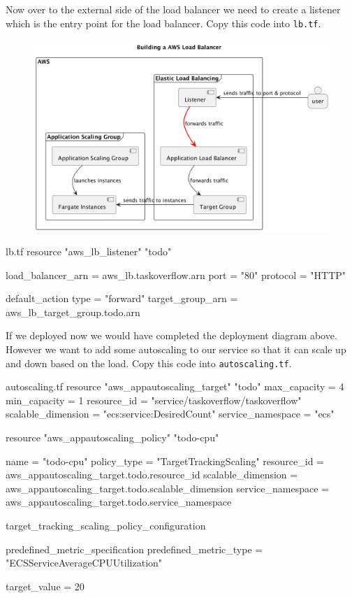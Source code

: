 \documentclass{csse4400}
\begin{document}
Now over to the external side of the load balancer we need to create a listener which is the entry point for the load balancer. Copy this code into \texttt{lb.tf}.

\begin{figure}[H]
  \begin{center}
    \includegraphics[scale=0.2]{diagrams/lb4fargate}
  \end{center}
\end{figure}

\begin{code}[language=terraform,numbers=none,keepspaces=true]{lb.tf}
resource "aws_lb_listener" "todo" {
  load_balancer_arn   = aws_lb.taskoverflow.arn
  port                = "80"
  protocol            = "HTTP"

  default_action {
    type              = "forward"
    target_group_arn  = aws_lb_target_group.todo.arn
  }
}
\end{code}

If we deployed now we would have completed the deployment diagram above. However we want to add some autoscaling to our service so that it can scale up and down based on the load. Copy this code into \texttt{autoscaling.tf}.

\begin{code}[language=terraform,numbers=none,keepspaces=true]{autoscaling.tf}
resource "aws_appautoscaling_target" "todo" {
  max_capacity        = 4
  min_capacity        = 1
  resource_id         = "service/taskoverflow/taskoverflow"
  scalable_dimension  = "ecs:service:DesiredCount"
  service_namespace   = "ecs"
}


resource "aws_appautoscaling_policy" "todo-cpu" {
  name                = "todo-cpu"
  policy_type         = "TargetTrackingScaling"
  resource_id         = aws_appautoscaling_target.todo.resource_id
  scalable_dimension  = aws_appautoscaling_target.todo.scalable_dimension
  service_namespace   = aws_appautoscaling_target.todo.service_namespace

  target_tracking_scaling_policy_configuration {
    predefined_metric_specification {
      predefined_metric_type  = "ECSServiceAverageCPUUtilization"
    }

    target_value              = 20
  }
}
\end{code}
\end{document}
